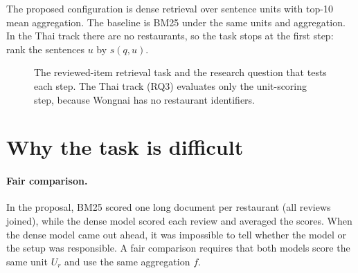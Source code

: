 The proposed configuration is dense retrieval over sentence units with top-10 mean
aggregation. The baseline is BM25 under the same units and aggregation. In the Thai track there
are no restaurants, so the task stops at the first step: rank the sentences $u$ by $s(q,u)$.

\begin{figure}[H]
\centering
{}
\caption{The reviewed-item retrieval task and the research question that tests each step.
The Thai track (RQ3) evaluates only the unit-scoring step, because Wongnai has no restaurant
identifiers.}
\label{fig:task}
\end{figure}

\section{Why the task is difficult}
\paragraph{Fair comparison.} In the proposal, BM25 scored one long document per restaurant
(all reviews joined), while the dense model scored each review and averaged the scores. When the
dense model came out ahead, it was impossible to tell whether the model or the setup was
responsible. A fair comparison requires that both models score the same unit $U_r$ and use the
same aggregation $f$.

